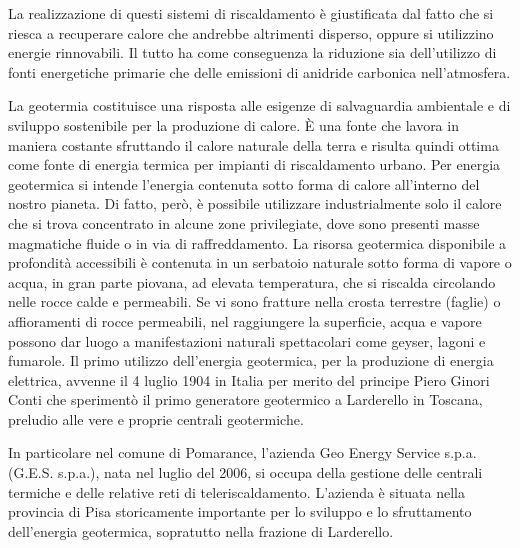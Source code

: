 \documentclass[laurea,oneside,11pt]{USiena_tesiLM}
\begin{document}
La realizzazione di questi sistemi di riscaldamento è giustificata dal fatto che si riesca a recuperare calore che andrebbe altrimenti disperso, oppure si utilizzino energie rinnovabili. Il tutto ha come conseguenza la riduzione sia dell'utilizzo di fonti energetiche primarie che delle emissioni di anidride carbonica nell'atmosfera.

La geotermia costituisce una risposta alle esigenze di salvaguardia ambientale e di sviluppo sostenibile per la produzione di calore. È una fonte che lavora in maniera costante sfruttando il calore naturale della terra e risulta quindi ottima come fonte di energia termica per impianti di riscaldamento urbano.
Per energia geotermica si intende l'energia contenuta sotto forma di calore all'interno del nostro pianeta. Di fatto, però, è possibile utilizzare industrialmente solo il calore che si trova concentrato in alcune zone privilegiate, dove sono presenti masse magmatiche fluide o in via di raffreddamento. La risorsa geotermica disponibile a profondità accessibili è contenuta in un serbatoio naturale sotto forma di vapore o acqua, in gran parte piovana, ad elevata temperatura, che si riscalda circolando nelle rocce calde e permeabili. Se vi sono fratture nella crosta terrestre (faglie) o affioramenti di rocce permeabili, nel raggiungere la superficie, acqua e vapore possono dar luogo a manifestazioni naturali spettacolari come geyser, lagoni e fumarole.
Il primo utilizzo dell'energia geotermica, per la produzione di energia elettrica, avvenne il 4 luglio 1904 in Italia per merito del principe Piero Ginori Conti che sperimentò il primo generatore geotermico a Larderello in Toscana, preludio alle vere e proprie centrali geotermiche.
  
In particolare nel comune di Pomarance, l'azienda Geo Energy Service s.p.a. (G.E.S. s.p.a.), nata nel luglio del 2006, si occupa della gestione delle centrali termiche e delle relative reti di teleriscaldamento. L'azienda è situata nella provincia di Pisa storicamente importante per lo sviluppo e lo sfruttamento dell'energia geotermica, sopratutto nella frazione di Larderello.
\end{document}
